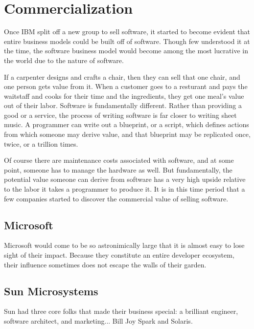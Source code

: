 
\section{Commercialization}

Once IBM split off a new group to sell software, it started to become
evident that entire business models could be built off of software.
Though few understood it at the time, the software business model
would become among the most lucrative in the world due to the nature of software.

If a carpenter designs and crafts a chair, then they can sell that one chair,
and one person gets value from it.
When a customer goes to a resturant and pays the waitstaff and cooks for their
time and the ingredients, they get one meal's value out of their labor.
Software is fundamentally different.
Rather than providing a good or a service, the process of writing software
is far closer to writing sheet music.
A programmer can write out a blueprint, or a script, which defines actions
from which someone may derive value, and that blueprint may be replicated
once, twice, or a trillion times.

Of course there are maintenance costs associated with software, and at some point,
someone has to manage the hardware as well.
But fundamentally, the potential value someone can derive from software
has a very high upside relative to the labor it takes a programmer to produce
it. It is in this time period that a few companies started to discover the
commercial value of selling software.

\subsection{Microsoft}

Microsoft would come to be so astronimically large that it is almost easy
to lose sight of their impact. Because they constitute an entire
developer ecosystem, their influence sometimes does not escape the walls
of their garden.


\subsection{Sun Microsystems}

Sun had three core folks that made their business special: a brilliant engineer, software architect, and marketing...
Bill Joy Spark and Solaris.
